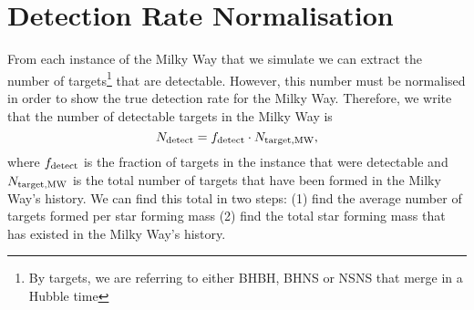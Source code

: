 \section{Detection Rate Normalisation}\label{app:rate_normalisation}
From each instance of the Milky Way that we simulate we can extract the number of targets\footnote{By targets, we are referring to either BHBH, BHNS or NSNS that merge in a Hubble time} that are detectable. However, this number must be normalised in order to show the true detection rate for the Milky Way. Therefore, we write that the number of detectable targets in the Milky Way is
\begin{equation}\label{eq:norm_frame}
    N_{\rm detect} = f_{\rm detect} \cdot N_{\rm target, MW},
\end{equation}
where $f_{\rm detect}$ is the fraction of targets in the instance that were detectable and $N_{\rm target, MW}$ is the total number of targets that have been formed in the Milky Way's history. We can find this total in two steps: (1) find the average number of targets formed per star forming mass (2) find the total star forming mass that has existed in the Milky Way's history.

